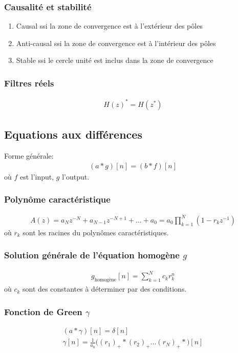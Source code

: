 \documentclass[a4paper]{amsart}
\begin{document}
\subsubsection{Causalité et stabilité}
\begin{enumerate}
	\item Causal ssi la zone de convergence est à l'extérieur des pôles
	\item Anti-causal ssi la zone de convergence est à l'intérieur des pôles
	\item Stable ssi le cercle unité est inclus dans la zone de convergence
\end{enumerate}
\subsubsection{Filtres réels}
\begin{eqnarray}
	H(z)^*=H(z^*)
\end{eqnarray}
\subsection{Equations aux différences}
Forme générale:
\begin{eqnarray}
	(a*g)[n]=(b*f)[n]
\end{eqnarray}
où $f$ est l'input, $g$ l'output.
\subsubsection{Polynôme caractéristique}
\begin{eqnarray}
	A(z)=a_Nz^{-N}+a_{N-1}z^{-N+1}+\dots+a_0=a_0\prod_{k=1}^N(1-r_kz^{-1})
\end{eqnarray}
où $r_k$ sont les racines du polynômes caractéristiques.
\subsubsection{Solution générale de l'équation homogène $g$}
\begin{eqnarray}
	g_{\text{homogène}}[n]=\sum_{k=1}^Nc_kr_k^n
\end{eqnarray}
où $c_k$ sont des constantes à déterminer par des conditions.
\subsubsection{Fonction de Green $\gamma$}
\begin{eqnarray}
	(a*\gamma)[n]=\delta[n]\\
	\gamma[n]=\frac{1}{a_0}\big((r_1)_+*(r_2)_+\dots(r_N)_+*\big)[n]
\end{eqnarray}
\end{document}
